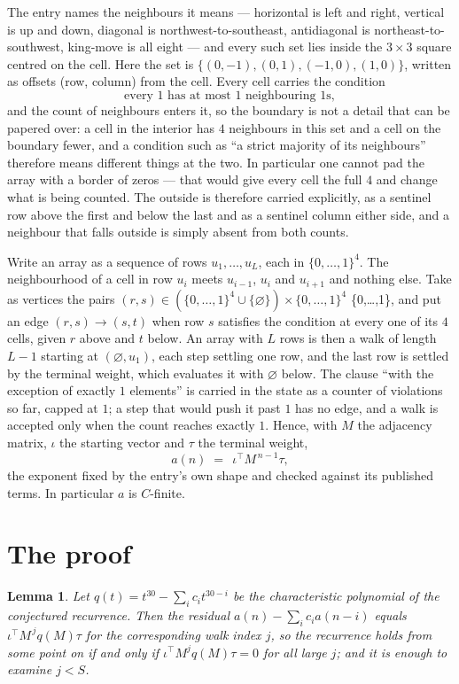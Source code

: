 \documentclass[11pt,a4paper]{article}
\theoremstyle{plain}
\newtheorem{lemma}[theorem]{Lemma}
\theoremstyle{definition}
\begin{document}
The entry names the neighbours it means --- horizontal is left and right, vertical is up and
down, diagonal is northwest-to-southeast, antidiagonal is northeast-to-southwest, king-move is
all eight --- and every such set lies inside the $3\times3$ square centred on the cell. Here
the set is $\{(0,-1), (0,1), (-1,0), (1,0)\}$, written as offsets (row, column) from the cell. Every cell carries
the condition
\[
\text{every 1 has at most 1 neighbouring 1s},
\]
and the count of neighbours enters it, so the boundary is not a detail that can be papered
over: a cell in the interior has $4$ neighbours in this set and a cell on the boundary
fewer, and a condition such as ``a strict majority of its neighbours'' therefore means
different things at the two. In particular one cannot pad the array with a border of zeros ---
that would give every cell the full $4$ and change what is being counted. The outside is
therefore carried
explicitly, as a sentinel row above the first and below the last and as a sentinel column
either side, and a neighbour that falls outside is simply absent from both counts.

Write an array as a sequence of rows $u_1,\dots,u_L$, each in
$\{0,\dots,1\}^{4}$. The neighbourhood of a cell in row $u_i$ meets $u_{i-1}$,
$u_i$ and $u_{i+1}$ and nothing else. Take as vertices the pairs
$(r,s)\in(\{0,\dots,1\}^{4}\cup\{\varnothing\})\times\{0,\dots,1\}^{4}$ \times \{0,\dots,1\},
and put an edge $(r,s)\to(s,t)$ when row $s$ satisfies the condition at every one of its
$4$ cells, given $r$ above and $t$ below. An array with $L$ rows is then a walk of length
$L-1$ starting at $(\varnothing,u_1)$, each step settling one row, and the last row is
settled by the terminal weight, which evaluates it with $\varnothing$ below. The clause ``with the exception of exactly $1$ elements'' is carried in
the state as a counter of violations so far, capped at $1$; a step that would push it past
$1$ has no edge, and a walk is accepted only when the count reaches exactly $1$. Hence,
with $M$ the adjacency matrix, $\iota$ the starting vector and $\tau$ the terminal weight,
\[
a(n)\;=\;\,\iota^{\!\top}M^{\,n-1}\tau ,
\]
the exponent fixed by the entry's own shape and checked against its published terms. In
particular $a$ is $C$-finite.

\section{The proof}

\begin{lemma}\label{lem:crit}
Let $q(t)=t^{30}-\sum_i c_it^{30-i}$ be the characteristic polynomial of the
conjectured recurrence. Then the residual $a(n)-\sum_ic_ia(n-i)$ equals
$\iota^{\!\top}M^{\,j}q(M)\tau$ for the corresponding walk index $j$, so the
recurrence holds from some point on if and only if $\iota^{\!\top}M^{j}q(M)\tau=0$ for all
large $j$; and it is enough to examine $j<S$.
\end{lemma}
\end{document}
